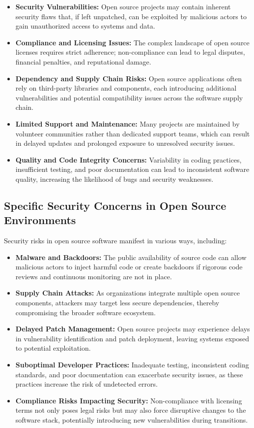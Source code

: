 \begin{itemize}
    \item \textbf{Security Vulnerabilities:} Open source projects may contain inherent security flaws that, if left unpatched, can be exploited by malicious actors to gain unauthorized access to systems and data.
    \item \textbf{Compliance and Licensing Issues:} The complex landscape of open source licenses requires strict adherence; non-compliance can lead to legal disputes, financial penalties, and reputational damage.
    \item \textbf{Dependency and Supply Chain Risks:} Open source applications often rely on third-party libraries and components, each introducing additional vulnerabilities and potential compatibility issues across the software supply chain.
    \item \textbf{Limited Support and Maintenance:} Many projects are maintained by volunteer communities rather than dedicated support teams, which can result in delayed updates and prolonged exposure to unresolved security issues.
    \item \textbf{Quality and Code Integrity Concerns:} Variability in coding practices, insufficient testing, and poor documentation can lead to inconsistent software quality, increasing the likelihood of bugs and security weaknesses.
\end{itemize}

\cite{OpenSource-Software-Risks-Disadvantages}

\subsection{Specific Security Concerns in Open Source Environments}

Security risks in open source software manifest in various ways, including:

\begin{itemize}
    \item \textbf{Malware and Backdoors:} The public availability of source code can allow malicious actors to inject harmful code or create backdoors if rigorous code reviews and continuous monitoring are not in place.
    \item \textbf{Supply Chain Attacks:} As organizations integrate multiple open source components, attackers may target less secure dependencies, thereby compromising the broader software ecosystem.
    \item \textbf{Delayed Patch Management:} Open source projects may experience delays in vulnerability identification and patch deployment, leaving systems exposed to potential exploitation.
    \item \textbf{Suboptimal Developer Practices:} Inadequate testing, inconsistent coding standards, and poor documentation can exacerbate security issues, as these practices increase the risk of undetected errors.
    \item \textbf{Compliance Risks Impacting Security:} Non-compliance with licensing terms not only poses legal risks but may also force disruptive changes to the software stack, potentially introducing new vulnerabilities during transitions.
\end{itemize}

